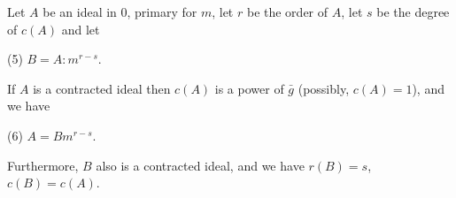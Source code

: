 Let $A$ be an ideal in $0$, primary for $m$, let $r$ be the order of $A$, let $s$ be the degree of $c(A)$ and let

(5) $B = A: m^{r-s}$.

If $A$ is a contracted ideal then $c(A)$ is a power of $\bar{g}$ (possibly, $c(A) = 1$), and we have

(6) $A = B m^{r-s}$.

Furthermore, $B$ also is a contracted ideal, and we have $r(B) = s$, $c(B) = c(A)$.